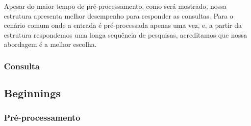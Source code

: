 \documentclass[12pt]{article}
\begin{document}
Apesar do maior tempo de pré-processamento, como será mostrado, nossa estrutura apresenta
melhor desempenho para responder as consultas. Para o cenário comum onde a entrada
é pré-processada apenas uma vez, e, a partir da estrutura respondemos uma longa
sequência de pesquisas, acreditamos que nossa abordagem é a melhor escolha.


\subsubsection{Consulta}

\subsection{Beginnings}

\subsubsection{Pré-processamento}
\end{document}

